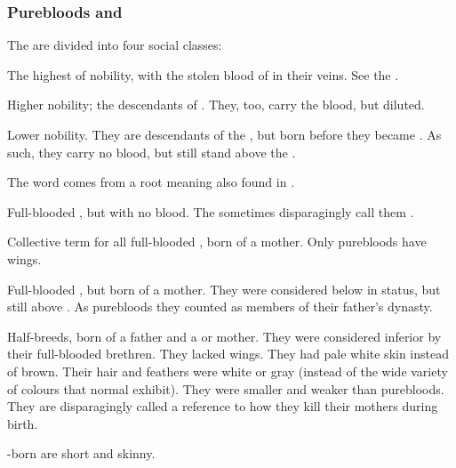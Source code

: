 \subsubsection{Purebloods and \ashenbloods}
The \resphain{} are divided into four social classes:
\begin{gloss}
  \gitem[\satharioth]{\sathariah}
  The highest of \resphan{} nobility, with the stolen blood of \Nexagglachel{} in their veins. 
  See the . 
  
  \gitem[\ketherain]{\ketheran}
  Higher nobility; the descendants of \satharioth. 
  They, too, carry the \draconian{} blood, but diluted.   
  
  \gitem[\ruistheleth]{\ruisthel}
  Lower nobility. 
  They are descendants of the \satharioth, but born before they became \satharioth. 
  As such, they carry no \draconian{} blood, but still stand above the \thelyadeth. 
  
  The word comes from a root  meaning \dash also found in . 
  
  \gitem[\thelyadeth]{\thelyad}
  Full-blooded \resphain, but with no \sathariah{} blood. 
  The \ketherain{} sometimes disparagingly call them . 
  
  Collective term for all full-blooded \resphain{}, born of a \resvil{} mother. 
  Only purebloods have wings. 
  
  \gitem[\gessurim]{\gessur}
  Full-blooded \resphain, but born of a  mother. 
  They were considered below \thelyadeth{} in status, but still above \bezedeth. 
  As purebloods they counted as members of their father's dynasty. 
  
  \gitem[\bezedeth]{\bezed}
  Half-breeds, born of a \resphan{} father and a \human{} or \nephilic{} mother. 
  They were considered inferior by their full-blooded brethren. 
  They lacked wings.
  They had pale white skin instead of brown.
  Their hair and feathers were white or gray (instead of the wide variety of colours that normal \resphain exhibit). 
  They were smaller and weaker than purebloods. 
  They are disparagingly called \quo{\ashenbloods}\dash a reference to how they kill their mothers during birth. 
  
  \Human-born \resphain{} are short and skinny. 
  

\end{gloss}
